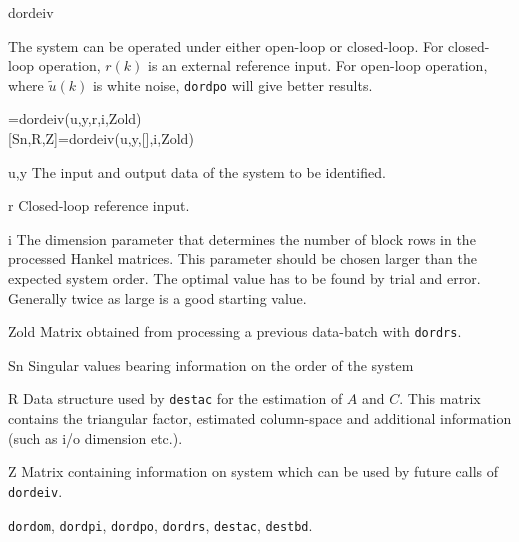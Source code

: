 \documentclass{book}
\newcommand{\destbd}{\texttt{destbd}}
\newcommand{\dordom}{\texttt{dordom}}
\newcommand{\dordpo}{\texttt{dordpo}}
\newcommand{\dordpi}{\texttt{dordpi}}
\newcommand{\dordrs}{\texttt{dordrs}}
\newcommand{\dordeiv}{\texttt{dordeiv}}
\newcommand{\destac}{\texttt{destac}}
\begin{document}
\begin{command}{dordeiv}
\begin{purpose}
  The system can be operated under either open-loop or closed-loop.
  For closed-loop operation, $r(k)$ is an external reference input.
  For open-loop operation, where $\tilde{u}(k)$ is white noise,
  {\dordpo} will give better results.
\end{purpose}
\begin{syntax}
  [Sn,R,Z]=dordeiv(u,y,r,i,Zold)\\[0pt]
  [Sn,R,Z]=dordeiv(u,y,[],i,Zold)\\
\end{syntax}
\begin{inputs}
\item[u,y] The input and output data of the system to be identified.
\item[r]  Closed-loop reference input. 
\item[i] The dimension parameter that determines the number of block
  rows in the processed Hankel matrices. This parameter should be
  chosen larger than the expected system order. The optimal value has
  to be found by trial and error. Generally twice as large is a good
  starting value.
\item[Zold] Matrix obtained from processing a previous
  data-batch with {\dordrs}.
\end{inputs}
\begin{outputs}
\item[Sn] Singular values bearing information on the order
  of the system \\
\item[R] Data structure used by {\destac} for the estimation of $A$
  and $C$. This matrix contains the triangular factor, estimated
  column-space and additional information (such as i/o dimension
  etc.).
\item[Z] Matrix containing information on system which can be used by 
  future calls of {\dordeiv}.
\end{outputs}
\begin{seealso}
\dordom, \dordpi, \dordpo, \dordrs, \destac, \destbd.

\end{seealso}
\end{command}%
\end{document}
